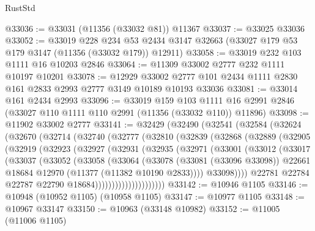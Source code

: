 \begin{lexlean}{RustStd}
\begin{coremodule}
@33036 := @33031 (@11356 (@33032 @81)) @11367
@33037 := @33025 @33036
@33052 := @33019
    @228
    @234
    @53
    @2434
    @3147
    @32663
    (@33027 @179 @53 @179 @3147 (@11356 (@33032 @179)) @12911)
@33058 := @33019 @232 @103 @1111 @16 @10203 @2846
@33064 := @11309 @33002 @2777 @232 @1111 @10197 @10201
@33078 := @12929
    @33002
    @2777
    @101
    @2434
    @1111
    @2830
    @161
    @2833
    @2993
    @2777
    @3149
    @10189
    @10193
    @33036
@33081 := @33014 @161 @2434 @2993
@33096 := @33019
    @159
    @103
    @1111
    @16
    @2991
    @2846
    (@33027 @110 @1111 @110 @2991 (@11356 (@33032 @110)) @11896)
@33098 := @11902 @33002 @2777
@33141 := @32429
    (@32490
      (@32541
        (@32584
          (@32624
            (@32670
              (@32714
                (@32740
                  (@32777
                    (@32810
                      (@32839
                        (@32868
                          (@32889
                            (@32905
                              (@32919
                                (@32923
                                  (@32927
                                    (@32931
                                      (@32935
                                        (@32971
                                          (@33001
                                            (@33012
                                              (@33017
                                                (@33037
                                                  (@33052
                                                    (@33058
                                                      (@33064
                                                        (@33078
                                                          (@33081 (@33096 @33098))
                                                          @22661
                                                          @18684
                                                          @12970
                                                          (@11377 (@11382 @10190 @2833))))
                                                      @33098))))
                                              @22781
                                              @22784
                                              @22787
                                              @22790
                                              @18684)))))))))))))))))))))
@33142 := @10946 @1105
@33146 := @10948 (@10952 @1105) (@10958 @1105)
@33147 := @10977 @1105
@33148 := @10967 @33147
@33150 := @10963 (@33148 @10982)
@33152 := @11005 (@11006 @1105)

\end{coremodule}
\end{lexlean}

